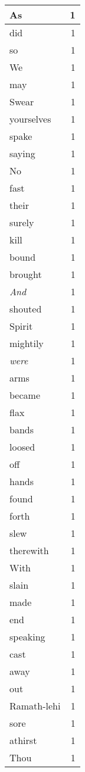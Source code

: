 \begin{center}
\begin{longtable}{l|r}
As & 1\\ \hline 
did & 1\\ \hline 
so & 1\\ \hline 
We & 1\\ \hline 
may & 1\\ \hline 
Swear & 1\\ \hline 
yourselves & 1\\ \hline 
spake & 1\\ \hline 
saying & 1\\ \hline 
No & 1\\ \hline 
fast & 1\\ \hline 
their & 1\\ \hline 
surely & 1\\ \hline 
kill & 1\\ \hline 
bound & 1\\ \hline 
brought & 1\\ \hline 
\emph{And} & 1\\ \hline 
shouted & 1\\ \hline 
Spirit & 1\\ \hline 
mightily & 1\\ \hline 
\emph{were} & 1\\ \hline 
arms & 1\\ \hline 
became & 1\\ \hline 
flax & 1\\ \hline 
bands & 1\\ \hline 
loosed & 1\\ \hline 
off & 1\\ \hline 
hands & 1\\ \hline 
found & 1\\ \hline 
forth & 1\\ \hline 
slew & 1\\ \hline 
therewith & 1\\ \hline 
With & 1\\ \hline 
slain & 1\\ \hline 
made & 1\\ \hline 
end & 1\\ \hline 
speaking & 1\\ \hline 
cast & 1\\ \hline 
away & 1\\ \hline 
out & 1\\ \hline 
Ramath-lehi & 1\\ \hline 
sore & 1\\ \hline 
athirst & 1\\ \hline 
Thou & 1\\ \hline 

\end{longtable}
\end{center}
